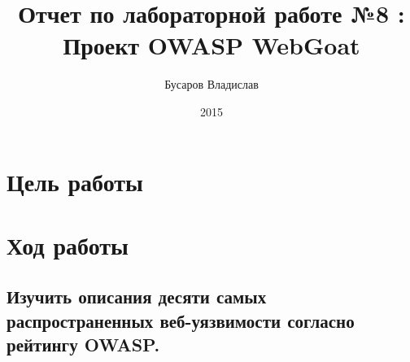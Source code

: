 \documentclass[11pt, a4paper]{article}		%
\author{Бусаров Владислав}
\title{Отчет по лабораторной работе №8 :\\ Проект OWASP WebGoat}
\date{2015}
\begin{document}
\maketitle
\tableofcontents
\newpage



\section{Цель работы}



\section{Ход работы}



\subsection{Изучить описания десяти самых распространенных веб-уязвимости согласно рейтингу OWASP.}
\end{document}
